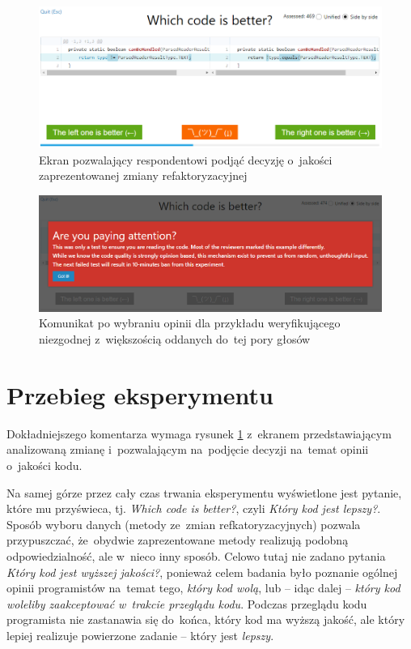 \documentclass[twoside]{praca}
\begin{document}
\begin{figure}
\centering
\includegraphics[width=\textwidth]{impl/codefracz-codediff.png}
\caption{Ekran pozwalający respondentowi podjąć decyzję o~jakości zaprezentowanej zmiany refaktoryzacyjnej}
\label{fig:impl:codefracz-codediff}
\end{figure}

\begin{figure}
\centering
\includegraphics[width=\textwidth]{impl/codefracz-warning.png}
\caption{Komunikat po wybraniu opinii dla przykładu weryfikującego niezgodnej z~większością oddanych do~tej pory głosów}
\label{fig:impl:codefracz-warning}
\end{figure}

\section{Przebieg eksperymentu}

Dokładniejszego komentarza wymaga rysunek \ref{fig:impl:codefracz-codediff} z~ekranem przedstawiającym analizowaną zmianę i~pozwalającym na~podjęcie decyzji na~temat opinii o~jakości kodu.

Na samej górze przez cały czas trwania eksperymentu wyświetlone jest pytanie, które mu przyświeca, tj. \textit{Which code is better?}, czyli \textit{Który kod jest lepszy?}. Sposób wyboru danych (metody ze~zmian refkatoryzacyjnych) pozwala przypuszczać, że~obydwie zaprezentowane metody realizują podobną odpowiedzialność, ale w~nieco inny sposób. Celowo tutaj nie zadano pytania \textit{Który kod jest wyższej jakości?}, ponieważ celem badania było poznanie ogólnej opinii programistów na~temat tego, \textit{który kod wolą}, lub -- idąc dalej -- \textit{który kod woleliby zaakceptować w~trakcie przeglądu kodu}. Podczas przeglądu kodu programista nie zastanawia się do~końca, który kod ma wyższą jakość, ale który lepiej realizuje powierzone zadanie -- który jest \textit{lepszy}.
\end{document}
